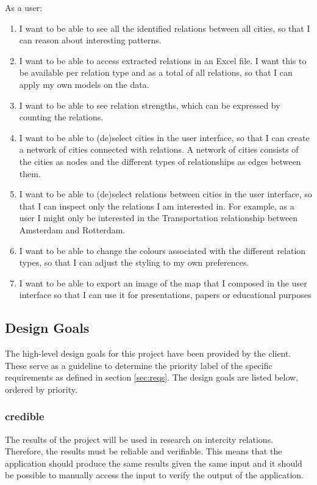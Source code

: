 As a user:
\begin{enumerate}
    \item I want to be able to see all the identified relations between all cities, so that I can reason about interesting patterns.
    \item I want to be able to access extracted relations in an Excel file. I want this to be available per relation type and as a total of all relations, so that I can apply my own models on the data.
    \item I want to be able to see relation strengths, which can be expressed by counting the relations.
    \item I want to be able to (de)select cities in the user interface, so that I can create a network of cities connected with relations. A network of cities consists of the cities as nodes and the different types of relationships as edges between them.
    \item I want to be able to (de)select relations between cities in the user interface, so that I can inspect only the relations I am interested in. For example, as a user I might only be interested in the Transportation relationship between Amsterdam and Rotterdam.
    \item I want to be able to change the colours associated with the different relation types, so that I can adjust the styling to my own preferences.
    \item I want to be able to export an image of the map that I composed in the user interface so that I can use it for presentations, papers or educational purposes
\end{enumerate}

\subsection{Design Goals} \label{sec:design-goals}
The high-level design goals for this project have been provided by the client. These serve as a guideline to determine the priority label of the specific requirements as defined in section \ref{sec:reqs}. The design goals are listed below, ordered by priority. 

\subsubsection{credible} The results of the project will be used in research on intercity relations. Therefore, the results must be reliable and verifiable. This means that the application should produce the same results given the same input and it should be possible to manually access the input to verify the output of the application.
